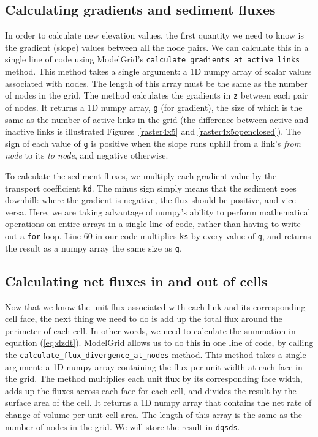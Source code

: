\documentclass[12pt]{article}
\newcommand{\code}[1]{{\tt #1}}
\begin{document}
\subsection{Calculating gradients and sediment fluxes}



In order to calculate new elevation values, the first quantity we need to know is the gradient (slope) values between all the node pairs. We can calculate this in a single line of code using ModelGrid's \code{calculate\_gradients\_at\_active\_links} method. This method takes a single argument: a 1D numpy array of scalar values associated with nodes. The length of this array must be the same as the number of nodes in the grid. The method calculates the gradients in \code{z} between each pair of nodes. It returns a 1D numpy array, \code{g} (for gradient), the size of which is the same as the number of active links in the grid (the difference between active and inactive links is illustrated Figures~\ref{raster4x5} and \ref{raster4x5openclosed}). The sign of each value of \code{g} is positive when the slope runs uphill from a link's {\em from node} to its {\em to node}, and negative otherwise.

To calculate the sediment fluxes, we multiply each gradient value by the transport coefficient \code{kd}. The minus sign simply means that the sediment goes downhill: where the gradient is negative, the flux should be positive, and vice versa. Here, we are taking advantage of numpy's ability to perform mathematical operations on entire arrays in a single line of code, rather than having to write out a \code{for} loop. Line 60 in our code multiplies \code{ks} by every value of \code{g}, and returns the result as a numpy array the same size as \code{g}.

\subsection{Calculating net fluxes in and out of cells}



Now that we know the unit flux associated with each link and its corresponding cell face, the next thing we need to do is add up the total flux around the perimeter of each cell. In other words, we need to calculate the summation in equation (\ref{eq:dzdt}). ModelGrid allows us to do this in one line of code, by calling the \code{calculate\_flux\_divergence\_at\_nodes} method. This method takes a single argument: a 1D numpy array containing the flux per unit width at each face in the grid. The method multiplies each unit flux by its corresponding face width, adds up the fluxes across each face for each cell, and divides the result by the surface area of the cell. It returns a 1D numpy array that contains the net rate of change of volume per unit cell area. The length of this array is the same as the number of nodes in the grid. We will store the result in \code{dqsds}.
\end{document}
